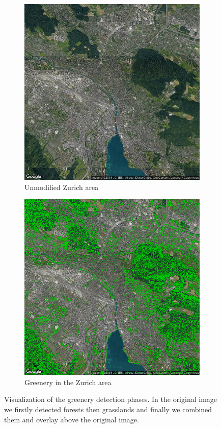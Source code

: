 \documentclass[letterpaper]{article}
\begin{document}
\begin{figure}
    \begin{subfigure}{.22\textwidth}
        \centering
        \includegraphics[width=.95\linewidth]{images/greenery/Zurich.png}
        \caption[width=.2\textwidth]{Unmodified Zurich area}
    \end{subfigure}%
    \begin{subfigure}{.22\textwidth}
        \centering
        \includegraphics[width=.95\linewidth]{images/greenery/Zurich_greenery.png}
        \caption[width=.2\textwidth]{Greenery in the Zurich area}
    \end{subfigure}
    \caption{Visualization of the greenery detection phases. In the original image we firstly detected forests then
             grasslands and finally we combined them and overlay above the original image.}
    \label{fig:ZurichGreenery}
\end{figure}
\end{document}
